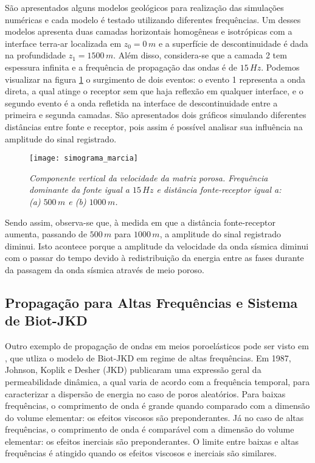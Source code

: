S\~ao apresentados alguns modelos geol\'ogicos para realiza\c{c}\~ao das simula\c{c}\~oes num\'ericas e cada modelo \'e testado utilizando diferentes frequ\^encias. Um desses modelos apresenta duas camadas horizontais homog\^eneas e isotr\'opicas com a interface terra-ar localizada em $z_0=0\,m$  e a superf\'icie de descontinuidade \'e dada na profundidade $z_1=1500\,m$. Al\'em disso,
considera-se que a camada 2 tem espessura infinita e a frequ\^encia de propaga\c{c}\~ao das ondas \'e de $15\,Hz$. Podemos visualizar na figura \ref{fig.marcia} o surgimento de dois eventos: o evento 1 representa a onda direta, a qual atinge o receptor sem que haja reflex\~ao em qualquer interface, e o segundo evento \'e a onda refletida na interface de descontinuidade entre a primeira e segunda camadas. S\~ao apresentados dois gr\'aficos simulando diferentes dist\^ancias entre fonte e receptor, pois assim \'e poss\'ivel analisar sua influ\^encia na amplitude do sinal registrado.
\begin{figure}
\centering
\texttt{[image: simograma\_marcia]}
\caption{\textit{Componente vertical da velocidade da matriz porosa. Frequ\^encia dominante da fonte igual a $15\,Hz$ e dist\^ancia fonte-receptor igual a: (a) $500\,m$ e (b) $1000\,m$.}}
\label{fig.marcia}
\end{figure}


Sendo assim, observa-se que, \`a medida em que a dist\^ancia fonte-receptor aumenta, passando de $500\,m$ para $1000\,m$, a amplitude do sinal registrado diminui. Isto acontece porque a amplitude da velocidade da onda s\'ismica diminui com o passar do tempo devido \`a redistribui\c{c}\~ao da energia entre as fases durante da passagem da onda s\'ismica atrav\'es de meio poroso. 

\subsection{Propaga\c{c}\~ao para Altas Frequ\^encias e Sistema de Biot-JKD}\label{sec.biot-jkd}

Outro exemplo de propaga\c{c}\~ao de ondas em meios poroel\'asticos pode ser visto em \cite{miranda_2016}, que utliza o modelo de Biot-JKD em regime de altas frequ\^encias. Em 1987, Johnson, Koplik e Desher (JKD) publicaram uma express\~ao geral da permeabilidade din\^amica, a qual varia de acordo com a frequ\^encia temporal, para caracterizar a dispers\~ao de energia no caso de poros aleat\'orios. Para baixas frequ\^encias, o comprimento de onda \'e grande quando comparado com a dimens\~ao do volume elementar: os efeitos viscosos s\~ao
preponderantes. J\'a no caso de altas frequ\^encias, o comprimento de onda \'e compar\'avel com a dimens\~ao do volume elementar: os efeitos inerciais s\~ao preponderantes. O limite entre baixas e altas frequ\^encias \'e atingido quando os efeitos viscosos e inerciais s\~ao similares.

